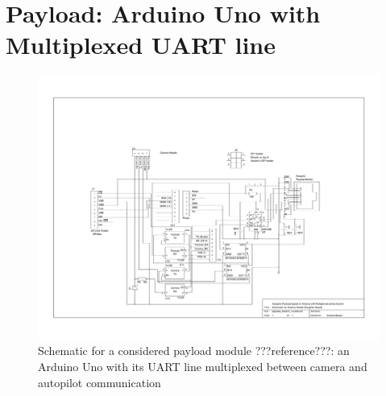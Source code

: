 \section{Payload: Arduino Uno with Multiplexed UART line}
\begin{figure}[H]
\includegraphics[width=1.4\textwidth, angle=90]{schematics/payload_arduino_muxed.pdf}
\caption{Schematic for a considered payload module ???reference???: an 
Arduino Uno with its UART line multiplexed between camera and autopilot 
communication}
\end{figure}
